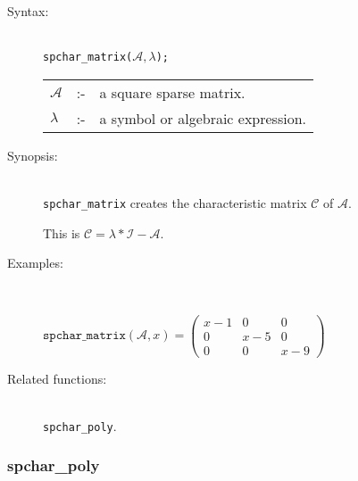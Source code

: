 \begin{description}
\item[Syntax:]\mbox{}\\
\texttt{spchar\_matrix($\mathcal{A},\lambda$);}\\[2mm]
\begin{tabular}{l l l}
$\mathcal{A}$ &:-& a square sparse matrix. \\
$\lambda$  &:-& a symbol or algebraic expression. 
\end{tabular}

\item[Synopsis:]\mbox{}\\
\texttt{spchar\_matrix} creates the characteristic matrix $\mathcal{C}$ of 
$\mathcal{A}$.

This is $\mathcal{C} = \lambda * \mathcal{I} - \mathcal{A}$. 

\item[Examples:]\mbox{}\\
\begin{flushleft}  
\begin{math}  
\texttt{spchar\_matrix}(\mathcal{A},x) = 
\begin{pmatrix} x-1 & 0 & 0 \\ 0 & x-5 & 0 \\ 0 & 0 & x-9 \end{pmatrix} 
\end{math}  
\end{flushleft}

\item[Related functions:]\mbox{}\\
\texttt{spchar\_poly}. 
\end{description}

\subsubsection{spchar\_poly}
\label{sparse:spchar_poly}

